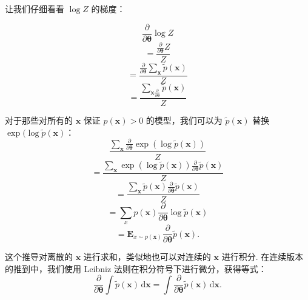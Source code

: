 让我们仔细看看 $\log Z$ 的梯度：

\begin{equation}  \label{eq:pyth}
\frac{\partial}{\partial \pmb{\theta}} \log Z
\end{equation}
\begin{equation}  \label{eq:pyth}
=\frac{\frac{\partial}{\partial \pmb{\theta}} Z}{Z}
\end{equation}
\begin{equation}  \label{eq:pyth}
=\frac{\frac{\partial}{\partial \pmb{\theta}} \sum_{\mathbf{x}} \tilde{p}(\mathbf{x})}{Z}
\end{equation}
\begin{equation}  \label{eq:pyth}
=\frac{\sum_{\mathbf{x} \frac{\partial}{\partial \pmb{\theta}}} \tilde{p}(\mathbf{x})}{Z}
\end{equation}

对于那些对所有的 $\mathbf{x}$ 保证 $p(\mathbf{x}) > 0$ 的模型，我们可以为 $\tilde{p}(\mathbf{x})$ 替换 $\exp(\log \tilde{p}(\mathbf{x})$：
\begin{equation}  \label{eq:pyth}
\frac{\sum_{\mathbf{x}} \frac{\partial}{\partial \pmb{\theta}} \exp(\log \tilde{p}(\mathbf{x}))}{Z}
\end{equation}
\begin{equation}  \label{eq:pyth}
=\frac{\sum_{\mathbf{x}} \exp(\log\tilde{p}(\mathbf{x})) \frac{\partial}{\partial \pmb{\theta}} \tilde{p}(\mathbf{x})}{Z}
\end{equation}
\begin{equation}  \label{eq:pyth}
=\frac{\sum_{\mathbf{x}} \tilde{p}(\mathbf{x}) \frac{\partial}{\partial \pmb{\theta}} \tilde{p}(\mathbf{x})}{Z}
\end{equation}
\begin{equation}  \label{eq:pyth}
=\sum_{x}p(\mathbf{x}) \frac{\partial}{\partial \pmb{\theta}} \log \tilde{p}(\mathbf{x})
\end{equation}
\begin{equation}  \label{eq:pyth}
=\mathbf{E}_{x\sim p(\mathbf{x})} \frac{\partial}{\partial \pmb{\theta}} \tilde{p}(\mathbf{x}).
\end{equation}

这个推导对离散的 $\pmb{x}$ 进行求和，类似地也可以对连续的 $\pmb{x}$ 进行积分. 在连续版本的推到中，我们使用 Leibniz 法则在积分符号下进行微分，获得等式：
\begin{equation}  \label{eq:pyth}
\frac{\partial}{\partial \pmb{\theta}} \int \!\tilde{p}(\mathbf{x}) \, \mathrm{d}\pmb{x} = \int \!\frac{\partial}{\partial \pmb{\theta}} \tilde{p}(\pmb{x}) \,\mathrm{d}\pmb{x}.
\end{equation}

